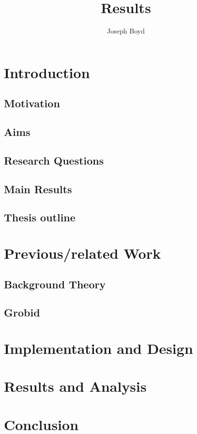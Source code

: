 \documentclass[11pt, oneside]{scrartcl}   	%
\title{Results}
\author{Joseph Boyd}
\begin{document}
\maketitle

\tableofcontents

\section{Introduction} %
\subsection{Motivation}
\subsection{Aims}
\subsection{Research Questions}
\subsection{Main Results}
\subsection{Thesis outline}

\section{Previous/related Work}
\subsection{Background Theory}
\subsection{Grobid}

\section{Implementation and Design}

\section{Results and Analysis}

\section{Conclusion}
\end{document}
